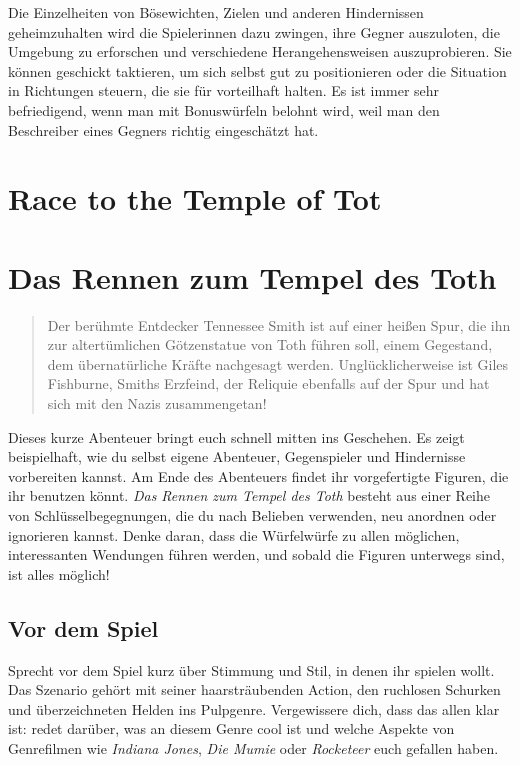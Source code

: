 \documentclass[]{article}
\begin{document}
Die Einzelheiten von Bösewichten, Zielen und anderen Hindernissen
geheimzuhalten wird die Spielerinnen dazu zwingen, ihre Gegner
auszuloten, die Umgebung zu erforschen und verschiedene
Herangehensweisen auszuprobieren. Sie können geschickt taktieren, um
sich selbst gut zu positionieren oder die Situation in Richtungen
steuern, die sie für vorteilhaft halten. Es ist immer sehr befriedigend,
wenn man mit Bonuswürfeln belohnt wird, weil man den Beschreiber eines
Gegners richtig eingeschätzt hat.

\section{Race to the Temple of Tot}\label{race-to-the-temple-of-tot}

\section{Das Rennen zum Tempel des
Toth}\label{das-rennen-zum-tempel-des-toth}

\begin{quote}
Der berühmte Entdecker Tennessee Smith ist auf einer heißen Spur, die
ihn zur altertümlichen Götzenstatue von Toth führen soll, einem
Gegestand, dem übernatürliche Kräfte nachgesagt werden.
Unglücklicherweise ist Giles Fishburne, Smiths Erzfeind, der Reliquie
ebenfalls auf der Spur und hat sich mit den Nazis zusammengetan!
\end{quote}

Dieses kurze Abenteuer bringt euch schnell mitten ins Geschehen. Es
zeigt beispielhaft, wie du selbst eigene Abenteuer, Gegenspieler und
Hindernisse vorbereiten kannst. Am Ende des Abenteuers findet ihr
vorgefertigte Figuren, die ihr benutzen könnt. \emph{Das Rennen zum
Tempel des Toth} besteht aus einer Reihe von Schlüsselbegegnungen, die
du nach Belieben verwenden, neu anordnen oder ignorieren kannst. Denke
daran, dass die Würfelwürfe zu allen möglichen, interessanten Wendungen
führen werden, und sobald die Figuren unterwegs sind, ist alles möglich!

\subsection{Vor dem Spiel}\label{vor-dem-spiel}

Sprecht vor dem Spiel kurz über Stimmung und Stil, in denen ihr spielen
wollt. Das Szenario gehört mit seiner haarsträubenden Action, den
ruchlosen Schurken und überzeichneten Helden ins Pulpgenre. Vergewissere
dich, dass das allen klar ist: redet darüber, was an diesem Genre cool
ist und welche Aspekte von Genrefilmen wie \emph{Indiana Jones},
\emph{Die Mumie} oder \emph{Rocketeer} euch gefallen haben.
\end{document}
